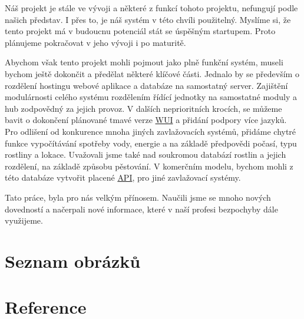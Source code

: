 \documentclass[czech,12pt,a4paper]{article}
\begin{document}
Náš projekt je stále ve vývoji a některé z funkcí tohoto projektu, nefungují podle našich představ. I přes to, je náš systém v této chvíli použitelný. Myslíme si, že tento projekt má v budoucnu potenciál stát se úspěšným startupem. Proto plánujeme pokračovat v jeho vývoji i po maturitě.

Abychom však tento projekt mohli pojmout jako plně funkční systém, museli bychom ještě dokončit a předělat některé klíčové části. Jednalo by se především o rozdělení hostingu webové aplikace a databáze na samostatný server. Zajištění modulárnosti celého systému rozdělením řídící jednotky na samostatné moduly a hub zodpovědný za jejich provoz. V dalších neprioritních krocích, se můžeme bavit o dokončení plánované tmavé verze \underline{\ac{WUI}} a přidání podpory více jazyků. Pro odlišení od konkurence mnoha jiných zavlažovacích systémů, přidáme chytré funkce vypočítávání spotřeby vody, energie a na základě předpovědi počasí, typu rostliny a lokace. Uvažovali jsme také nad soukromou databází rostlin a jejich rozdělení, na základě způsobu pěstování. V komerčním modelu, bychom mohli z této databáze vytvořit placené \underline{\ac{API}}, pro jiné zavlažovací systémy.

Tato práce, byla pro nás velkým přínosem. Naučili jsme se mnoho nových dovedností a načerpali nové informace, které v naší profesi bezpochyby dále využijeme.

\clearpage

\section{Seznam obrázků}

\vspace*{-1.5cm}
\listoffigures

\clearpage

\section{Reference}
\end{document}
